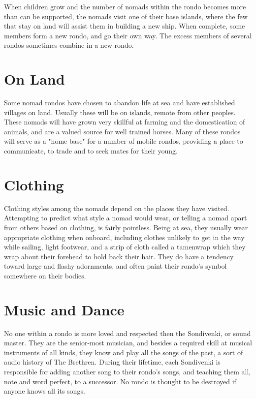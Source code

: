 When children grow and the number of nomads within the rondo becomes more than can be supported, the nomads visit one of their base islands, where the few that stay on land will assist them in building a new ship. When complete, some members form a new rondo, and go their own way. The excess members of several rondos sometimes combine in a new rondo.

\section{On Land}

Some nomad rondos have chosen to abandon life at sea and have established villages on land. Usually these will be on islands, remote from other peoples. These nomads will have grown very skillful at farming and the domestication of animals, and are a valued source for well trained horses. Many of these rondos will serve as a "home base" for a number of mobile rondos, providing a place to communicate, to trade and to seek mates for their young.

\section{Clothing}

Clothing styles among the nomads depend on the places they have visited. Attempting to predict what style a nomad would wear, or telling a nomad apart from others based on clothing, is fairly pointless. Being at sea, they usually wear appropriate clothing when onboard, including clothes unlikely to get in the way while sailing, light footwear, and a strip of cloth called a tamenwrap which they wrap about their forehead to hold back their hair. They do have a tendency toward large and flashy adornments, and often paint their rondo's symbol somewhere on their bodies.

\section{Music and Dance}

No one within a rondo is more loved and respected then the Sondivenki, or sound master. They are the senior-most musician, and besides a required skill at musical instruments of all kinds, they know and play all the songs of the past, a sort of audio history of The Brethren. During their lifetime, each Sondivenki is responsible for adding another song to their rondo's songs, and teaching them all, note and word perfect, to a successor. No rondo is thought to be destroyed if anyone knows all its songs.

